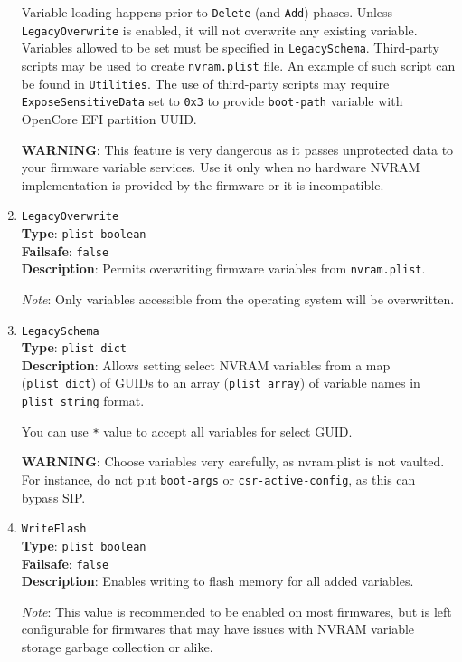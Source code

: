 \documentclass[]{article}
\begin{document}
\begin{enumerate}
  Variable loading happens prior to \texttt{Delete} (and \texttt{Add}) phases. Unless
  \texttt{LegacyOverwrite} is enabled, it will not overwrite any existing variable.
  Variables allowed to be set must be specified in \texttt{LegacySchema}.
  Third-party scripts may be used to create \texttt{nvram.plist}
  file. An example of such script can be found in \texttt{Utilities}. The use of third-party
  scripts may require \texttt{ExposeSensitiveData} set to \texttt{0x3} to provide
  \texttt{boot-path} variable with OpenCore EFI partition UUID.

  \textbf{WARNING}: This feature is very dangerous as it passes unprotected data to your
  firmware variable services. Use it only when no hardware NVRAM implementation is provided
  by the firmware or it is incompatible.

\item
  \texttt{LegacyOverwrite}\\
  \textbf{Type}: \texttt{plist\ boolean}\\
  \textbf{Failsafe}: \texttt{false}\\
  \textbf{Description}: Permits overwriting firmware variables from \texttt{nvram.plist}.

  \emph{Note}: Only variables accessible from the operating system will be overwritten.

\item
  \texttt{LegacySchema}\\
  \textbf{Type}: \texttt{plist\ dict}\\
  \textbf{Description}: Allows setting select NVRAM variables from a map
  (\texttt{plist\ dict}) of GUIDs to an array (\texttt{plist\ array}) of
  variable names in \texttt{plist\ string} format.

  You can use \texttt{*} value to accept all variables for select GUID.

  \textbf{WARNING}: Choose variables very carefully, as nvram.plist is not vaulted.
  For instance, do not put \texttt{boot-args} or \texttt{csr-active-config}, as
  this can bypass SIP.

\item
  \texttt{WriteFlash}\\
  \textbf{Type}: \texttt{plist\ boolean}\\
  \textbf{Failsafe}: \texttt{false}\\
  \textbf{Description}: Enables writing to flash memory for all added variables.

  \emph{Note}: This value is recommended to be enabled on most firmwares, but is
  left configurable for firmwares that may have issues with NVRAM variable storage
  garbage collection or alike.

\end{enumerate}
\end{document}

